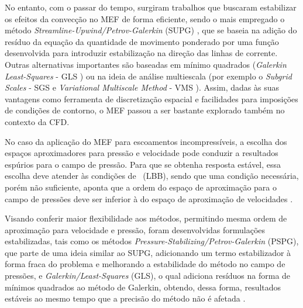 No entanto, com o passar do tempo, surgiram trabalhos que buscaram estabilizar os efeitos da convecção no MEF de forma eficiente, sendo o mais empregado o método \textit{Streamline-Upwind/Petrov-Galerkin} (SUPG) \cite{brooks1982streamline}, que se baseia na adição do resíduo da equação da quantidade de movimento ponderado por uma função desenvolvida para introduzir estabilização na direção das linhas de corrente. Outras alternativas importantes são baseadas em mínimo quadrados (\textit{Galerkin Least-Squares} - GLS \cite{hughes1989new,tezduyar1991stabilized}) ou na ideia de análise multiescala (por exemplo o \textit{Subgrid Scales} - SGS \cite{piomelli1999large,hughes2000large} e \textit{Variational Multiscale Method} - VMS \cite{hughes1995multiscale,hughes1998variational,hughes2000large}). Assim, dadas às suas vantagens como ferramenta de discretização espacial e facilidades para imposições de condições de contorno, o MEF passou a ser bastante explorado também no contexto da CFD.


No caso da aplicação do MEF para escoamentos incompressíveis, a escolha dos espaços aproximadores para pressão e velocidade pode conduzir a resultados espúrios para o campo de pressão. Para que se obtenha resposta estável, essa escolha deve atender às condições de \LBB\ (LBB), sendo que uma condição necessária, porém não suficiente, aponta que a ordem do espaço de aproximação para o campo de pressões deve ser inferior à do espaço de aproximação de velocidades \cite{BrezziF1991,donea2003finite,fernandes2020tecnica}.

Visando conferir maior flexibilidade aos métodos, permitindo mesma ordem de aproximação para velocidade e pressão, foram desenvolvidas formulações estabilizadas, tais como os métodos \textit{Pressure-Stabilizing/Petrov-Galerkin} (PSPG), que parte de uma ideia similar ao SUPG, adicionando um termo estabilizador à forma fraca do problema e melhorando a estabilidade do método no campo de pressões, e \textit{Galerkin/Least-Squares} (GLS), o qual adiciona resíduos na forma de mínimos quadrados ao método de Galerkin, obtendo, dessa forma, resultados estáveis ao mesmo tempo que a precisão do método não é afetada \cite{hughes1989new,TezduyarS2003}.


